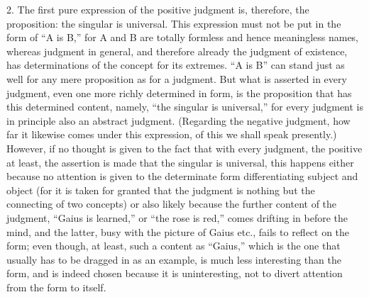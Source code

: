 2. The first pure expression of
the positive judgment is, therefore,
the proposition: the singular is universal.
This expression must not be put
in the form of “A is B,”
for A and B are totally formless
and hence meaningless names,
whereas judgment in general,
and therefore already the judgment of existence,
has determinations of the concept for its extremes.
“A is B” can stand just as well
for any mere proposition as for a judgment.
But what is asserted in every judgment,
even one more richly determined in form,
is the proposition that has this determined content,
namely, “the singular is universal,”
for every judgment is in principle
also an abstract judgment.
(Regarding the negative judgment,
how far it likewise comes under this expression,
of this we shall speak presently.)
However, if no thought is given to
the fact that with every judgment,
the positive at least,
the assertion is made that the singular is universal,
this happens either because no attention is
given to the determinate form differentiating subject and object
(for it is taken for granted that the judgment is
nothing but the connecting of two concepts)
or also likely because the further content of the judgment,
“Gaius is learned,” or “the rose is red,”
comes drifting in before the mind,
and the latter, busy with the picture of Gaius etc.,
fails to reflect on the form;
even though, at least, such a content as “Gaius,”
which is the one that usually has to be dragged in as an example,
is much less interesting than the form,
and is indeed chosen because it is uninteresting,
not to divert attention from the form to itself.


